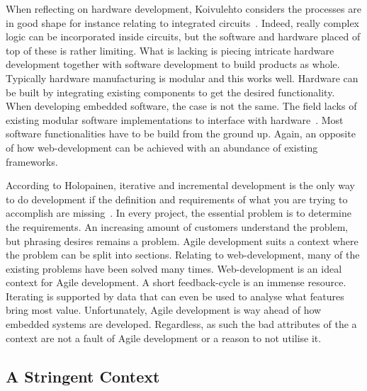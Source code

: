 \documentclass[english]{tktltiki2}
\begin{document}
When reflecting on hardware development, Koivulehto considers the processes are in good shape for instance relating to integrated circuits~\cite{Hol15a}. Indeed, really complex logic can be incorporated inside circuits, but the software and hardware placed of top of these is rather limiting. What is lacking is piecing intricate hardware development together with software development to build products as whole. Typically hardware manufacturing is modular and this works well. Hardware can be built by integrating existing components to get the desired functionality. When developing embedded software, the case is not the same. The field lacks of existing modular software implementations to interface with hardware~\cite{Hol15a}. Most software functionalities have to be build from the ground up. Again, an opposite of how web-development can be achieved with an abundance of existing frameworks.

According to Holopainen, iterative and incremental development is the only way to do development if the definition and requirements of what you are trying to accomplish are missing~\cite{Hol15a}. In every project, the essential problem is to determine the requirements. An increasing amount of customers understand the problem, but phrasing desires remains a problem. Agile development suits a context where the problem can be split into sections. Relating to web-development, many of the existing problems have been solved many times. Web-development is an ideal context for Agile development. A short feedback-cycle is an immense resource. Iterating is supported by data that can even be used to analyse what features bring most value. Unfortunately, Agile development is way ahead of how embedded systems are developed. Regardless, as such the bad attributes of the a context are not a fault of Agile development or a reason to not utilise it.

\subsection{A Stringent Context}
\end{document}
